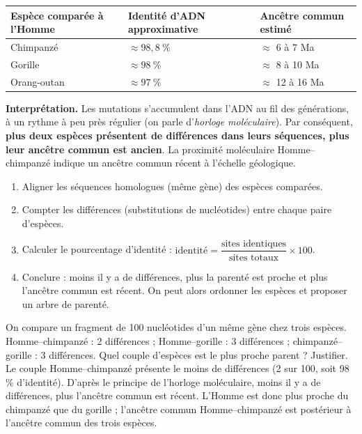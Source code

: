 \documentclass[11pt]{article}
\begin{document}
\begin{center}
\begin{tabularx}{\linewidth}{|l|X|X|}\hline
\rowcolor{popblueL} \textbf{Espèce comparée à l'Homme} & \textbf{Identité d'ADN approximative} & \textbf{Ancêtre commun estimé} \\ \hline
Chimpanzé & $\approx 98{,}8\ \%$ & $\approx$ 6 à 7 Ma \\ \hline
Gorille & $\approx 98\ \%$ & $\approx$ 8 à 10 Ma \\ \hline
Orang-outan & $\approx 97\ \%$ & $\approx$ 12 à 16 Ma \\ \hline
\end{tabularx}
\end{center}

\textbf{Interprétation.} Les mutations s'accumulent dans l'ADN au fil des générations, à un rythme à peu près régulier (on parle d'\emph{horloge moléculaire}). Par conséquent, \textbf{plus deux espèces présentent de différences dans leurs séquences, plus leur ancêtre commun est ancien}. La proximité moléculaire Homme--chimpanzé indique un ancêtre commun récent à l'échelle géologique.

\begin{methode}
\begin{enumerate}
\item Aligner les séquences homologues (même gène) des espèces comparées.
\item Compter les différences (substitutions de nucléotides) entre chaque paire d'espèces.
\item Calculer le pourcentage d'identité : $\text{identité} = \dfrac{\text{sites identiques}}{\text{sites totaux}} \times 100$.
\item Conclure : moins il y a de différences, plus la parenté est proche et plus l'ancêtre commun est récent. On peut alors ordonner les espèces et proposer un arbre de parenté.
\end{enumerate}
\end{methode}

\begin{exoresolu}
On compare un fragment de 100 nucléotides d'un même gène chez trois espèces. Homme--chimpanzé : 2 différences ; Homme--gorille : 3 différences ; chimpanzé--gorille : 3 différences. Quel couple d'espèces est le plus proche parent ? Justifier.
\tcblower
Le couple Homme--chimpanzé présente le moins de différences (2 sur 100, soit 98 \% d'identité). D'après le principe de l'horloge moléculaire, moins il y a de différences, plus l'ancêtre commun est récent. L'Homme est donc plus proche du chimpanzé que du gorille ; l'ancêtre commun Homme--chimpanzé est postérieur à l'ancêtre commun des trois espèces.
\end{exoresolu}
\end{document}
